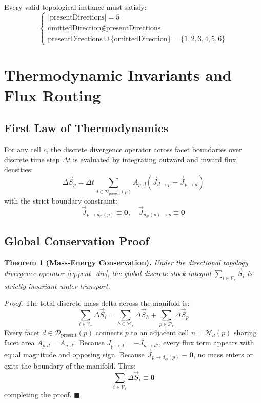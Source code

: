 \documentclass[10pt,journal,compsoc]{IEEEtran}
\begin{document}
\noindent Every valid topological instance must satisfy:
\begin{equation}
\begin{cases}
|\text{presentDirections}| = 5 \\
\text{omittedDirection} \notin \text{presentDirections} \\
\text{presentDirections} \cup \{\text{omittedDirection}\} = \{1, 2, 3, 4, 5, 6\}
\end{cases}
\end{equation}

\section{Thermodynamic Invariants and Flux Routing}

\subsection{First Law of Thermodynamics}
For any cell $c$, the discrete divergence operator across facet boundaries over discrete time step $\Delta t$ is evaluated by integrating outward and inward flux densities:
\begin{equation}
\Delta \vec{S}_p = \Delta t \sum_{d \in \mathcal{D}_{\text{present}}(p)} A_{p, d} \left( \vec{J}_{d \to p} - \vec{J}_{p \to d} \right)
\label{eq:pent_div}
\end{equation}
with the strict boundary constraint:
\begin{equation}
\vec{J}_{p \to d_\varnothing(p)} \equiv \mathbf{0}, \quad \vec{J}_{d_\varnothing(p) \to p} \equiv \mathbf{0}
\end{equation}

\subsection{Global Conservation Proof}
\textbf{Theorem 1 (Mass-Energy Conservation).} \textit{Under the directional topology divergence operator \eqref{eq:pent_div}, the global discrete stock integral $\sum_{i \in \mathcal{V}_r} \vec{S}_i$ is strictly invariant under transport.}

\textit{Proof.} The total discrete mass delta across the manifold is:
\begin{equation}
\sum_{i \in \mathcal{V}_r} \Delta \vec{S}_i = \sum_{h \in \mathcal{H}_r} \Delta \vec{S}_h + \sum_{p \in \mathcal{P}_r} \Delta \vec{S}_p
\end{equation}
Every facet $d \in \mathcal{D}_{\text{present}}(p)$ connects $p$ to an adjacent cell $n = \mathcal{N}_d(p)$ sharing facet area $A_{p,d} = A_{n, d'}$. Because $J_{p \to d} = -J_{n \to d'}$, every flux term appears with equal magnitude and opposing sign. Because $\vec{J}_{p \to d_\varnothing(p)} \equiv \mathbf{0}$, no mass enters or exits the boundary of the manifold. Thus:
\begin{equation}
\sum_{i \in \mathcal{V}_r} \Delta \vec{S}_i \equiv \mathbf{0}
\end{equation}
completing the proof. $\blacksquare$
\end{document}
